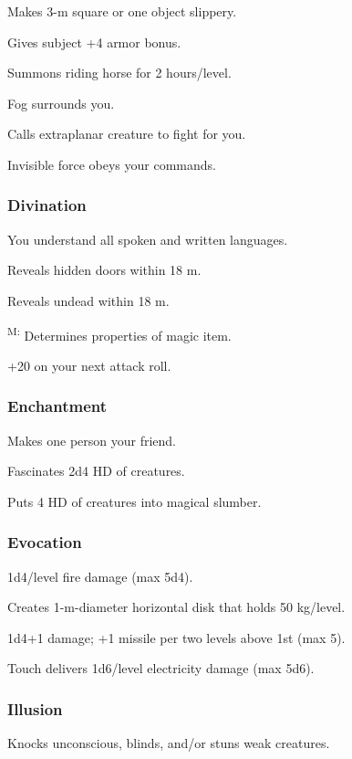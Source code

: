 	 Makes 3-m square or one object slippery.

	 Gives subject +4 armor bonus.

	 Summons riding horse for 2 hours/level.

	 Fog surrounds you.

	 Calls extraplanar creature to fight for you.

	 Invisible force obeys your commands.

\subsubsection{Divination}
	 You understand all spoken and written languages.

	 Reveals hidden doors within 18 m.

	 Reveals undead within 18 m.

	\textsuperscript{M:} Determines properties of magic item.

	 +20 on your next attack roll.

\subsubsection{Enchantment}
	 Makes one person your friend.

	 Fascinates 2d4 HD of creatures.

	 Puts 4 HD of creatures into magical slumber.

\subsubsection{Evocation}
	 1d4/level fire damage (max 5d4).

	 Creates 1-m-diameter horizontal disk that holds 50 kg/level.

	 1d4+1 damage; +1 missile per two levels above 1st (max 5).

	 Touch delivers 1d6/level electricity damage (max 5d6).

\subsubsection{Illusion}
	 Knocks unconscious, blinds, and/or stuns weak creatures.

